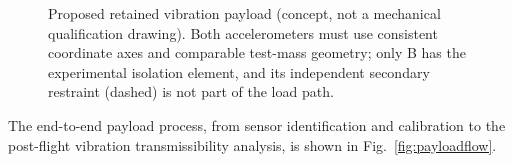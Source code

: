 \begin{figure}[htbp]
\caption{Proposed retained vibration payload (concept, not a mechanical qualification drawing). Both accelerometers must use consistent coordinate axes and comparable test-mass geometry; only B has the experimental isolation element, and its independent secondary restraint (dashed) is not part of the load path.}
\label{fig:vibrationpayload}
\end{figure}

The end-to-end payload process, from sensor identification and calibration to the post-flight vibration transmissibility analysis, is shown in Fig.~\ref{fig:payloadflow}.

